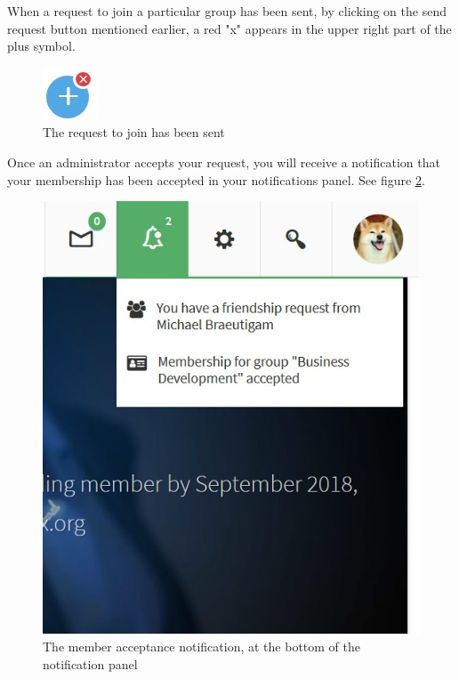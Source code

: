 \documentclass[10pt]{article}
\begin{document}
\begin{flushleft}
When a request to join a particular group has been sent, by clicking on the send request button mentioned earlier, a red "x" appears in the upper right part of the plus symbol.  
\end{flushleft}

\begin{figure}[h]
    \centering
    \includegraphics[scale=1]{images/requestsent.jpg}
    \caption{The request to join has been sent}
    \label{requestsent}
\end{figure}

\begin{flushleft}
Once an administrator accepts your request, you will receive a notification that your membership has been accepted in your notifications panel. See figure \ref{youaremember}.
\end{flushleft}

\begin{figure}[h]
    \centering
    \includegraphics[scale=0.5]{images/youaremember.jpg}
    \caption{The member acceptance notification, at the bottom of the notification panel}
    \label{youaremember}
\end{figure}
\end{document}
